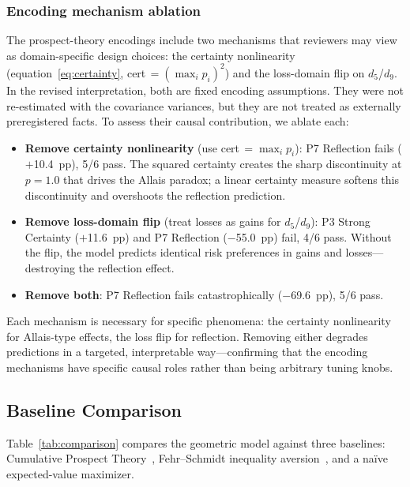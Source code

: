 \documentclass[journal]{IEEEtran}
\begin{document}
\subsubsection{Encoding mechanism ablation}
The prospect-theory encodings include two mechanisms that reviewers may view as domain-specific design choices: the certainty nonlinearity (equation~\eqref{eq:certainty}, cert\,$= (\max_i p_i)^2$) and the loss-domain flip on $d_5$/$d_9$.
In the revised interpretation, both are fixed encoding assumptions. They were not re-estimated with the covariance variances, but they are not treated as externally preregistered facts.
To assess their causal contribution, we ablate each:
\begin{itemize}
    \item \textbf{Remove certainty nonlinearity} (use cert\,$= \max_i p_i$): P7 Reflection fails ($+$10.4~pp), 5/6 pass.
    The squared certainty creates the sharp discontinuity at $p = 1.0$ that drives the Allais paradox; a linear certainty measure softens this discontinuity and overshoots the reflection prediction.
    \item \textbf{Remove loss-domain flip} (treat losses as gains for $d_5$/$d_9$): P3 Strong Certainty ($+$11.6~pp) and P7 Reflection ($-$55.0~pp) fail, 4/6 pass.
    Without the flip, the model predicts identical risk preferences in gains and losses---destroying the reflection effect.
    \item \textbf{Remove both}: P7 Reflection fails catastrophically ($-$69.6~pp), 5/6 pass.
\end{itemize}
Each mechanism is necessary for specific phenomena: the certainty nonlinearity for Allais-type effects, the loss flip for reflection.
Removing either degrades predictions in a targeted, interpretable way---confirming that the encoding mechanisms have specific causal roles rather than being arbitrary tuning knobs.

\subsection{Baseline Comparison}

Table~\ref{tab:comparison} compares the geometric model against three baselines: Cumulative Prospect Theory~\cite{tversky1992}, Fehr--Schmidt inequality aversion~\cite{fehr1999}, and a na\"ive expected-value maximizer.
\end{document}
